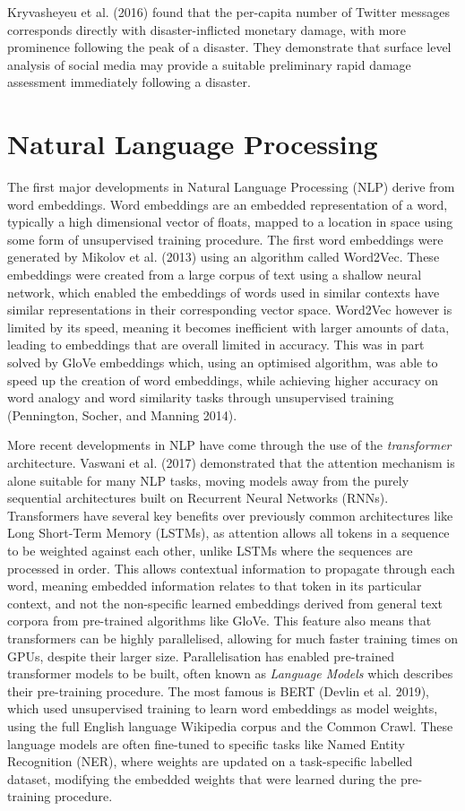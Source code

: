 \documentclass[a4paper, notitlepage]{extreport}
\begin{document}
Kryvasheyeu et al. (2016) found that the per-capita number of Twitter
messages corresponds directly with disaster-inflicted monetary damage,
with more prominence following the peak of a disaster. They demonstrate
that surface level analysis of social media may provide a suitable
preliminary rapid damage assessment immediately following a disaster.

\hypertarget{natural-language-processing}{%
\section{Natural Language
Processing}\label{natural-language-processing}}

The first major developments in Natural Language Processing (NLP) derive
from word embeddings. Word embeddings are an embedded representation of
a word, typically a high dimensional vector of floats, mapped to a
location in space using some form of unsupervised training procedure.
The first word embeddings were generated by Mikolov et al. (2013) using
an algorithm called Word2Vec. These embeddings were created from a large
corpus of text using a shallow neural network, which enabled the
embeddings of words used in similar contexts have similar
representations in their corresponding vector space. Word2Vec however is
limited by its speed, meaning it becomes inefficient with larger amounts
of data, leading to embeddings that are overall limited in accuracy.
This was in part solved by GloVe embeddings which, using an optimised
algorithm, was able to speed up the creation of word embeddings, while
achieving higher accuracy on word analogy and word similarity tasks
through unsupervised training (Pennington, Socher, and Manning 2014).

More recent developments in NLP have come through the use of the
\emph{transformer} architecture. Vaswani et al. (2017) demonstrated that
the attention mechanism is alone suitable for many NLP tasks, moving
models away from the purely sequential architectures built on Recurrent
Neural Networks (RNNs). Transformers have several key benefits over
previously common architectures like Long Short-Term Memory (LSTMs), as
attention allows all tokens in a sequence to be weighted against each
other, unlike LSTMs where the sequences are processed in order. This
allows contextual information to propagate through each word, meaning
embedded information relates to that token in its particular context,
and not the non-specific learned embeddings derived from general text
corpora from pre-trained algorithms like GloVe. This feature also means
that transformers can be highly parallelised, allowing for much faster
training times on GPUs, despite their larger size. Parallelisation has
enabled pre-trained transformer models to be built, often known as
\emph{Language Models} which describes their pre-training procedure. The
most famous is BERT (Devlin et al. 2019), which used unsupervised
training to learn word embeddings as model weights, using the full
English language Wikipedia corpus and the Common Crawl. These language
models are often fine-tuned to specific tasks like Named Entity
Recognition (NER), where weights are updated on a task-specific labelled
dataset, modifying the embedded weights that were learned during the
pre-training procedure.
\end{document}
